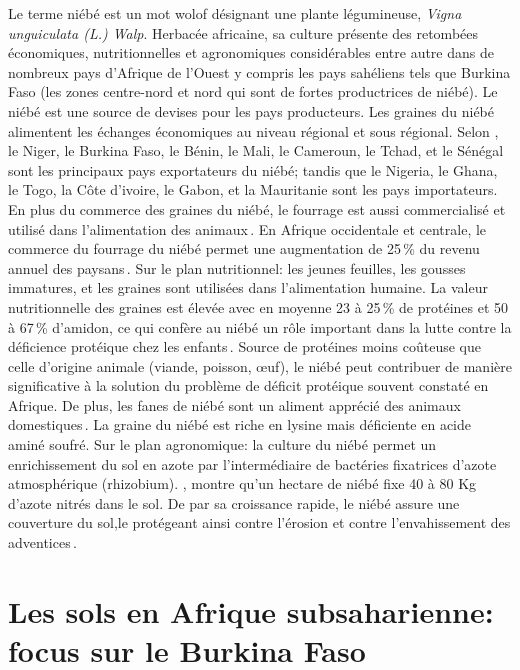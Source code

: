 \documentclass[a4paper,11pt]{article}
\begin{document}
Le terme niébé est un mot wolof désignant une plante légumineuse,
\emph{Vigna unguiculata (L.) Walp}. Herbacée africaine, sa culture
présente des retombées économiques, nutritionnelles et agronomiques
considérables entre autre dans de nombreux pays d'Afrique de l'Ouest y
compris les pays sahéliens tels que Burkina Faso (les zones
centre-nord et nord qui sont de fortes productrices de niébé).  Le
niébé est une source de devises pour les pays producteurs. Les graines
du niébé alimentent les échanges économiques au niveau régional et
sous régional. Selon \citeauthor{Langyintuo_2003},
\,\citeyear{Langyintuo_2003}\,le Niger, le Burkina Faso, le Bénin, le
Mali, le Cameroun, le Tchad, et le Sénégal sont les principaux pays
exportateurs du niébé; tandis que le Nigeria, le Ghana, le Togo, la
Côte d’ivoire, le Gabon, et la Mauritanie sont les pays
importateurs. En plus du commerce des graines du niébé, le fourrage
est aussi commercialisé et utilisé dans l’alimentation des
animaux\,\cite{Langyintuo_2003}. En Afrique occidentale et centrale,
le commerce du fourrage du niébé permet une augmentation de 25\,\% du
revenu annuel des paysans\,\cite{Quin_1997}. Sur le plan nutritionnel:
les jeunes feuilles, les gousses immatures, et les graines sont
utilisées dans l’alimentation humaine. La valeur nutritionnelle des
graines est élevée avec en moyenne 23 à 25\,\% de protéines et 50 à
67\,\% d’amidon, ce qui confère au niébé un rôle important dans la
lutte contre la déficience protéique chez les
enfants\,\cite{Quin_1997}. Source de protéines moins coûteuse que
celle d’origine animale (viande, poisson, œuf), le niébé peut
contribuer de manière significative à la solution du problème de
déficit protéique souvent constaté en Afrique. De plus, les fanes de
niébé sont un aliment apprécié des animaux
domestiques\,\cite{BAMBARA_2008}. La graine du niébé est riche en
lysine mais déficiente en acide aminé soufré. Sur le plan agronomique:
la culture du niébé permet un enrichissement du sol en azote par
l’intermédiaire de bactéries fixatrices d’azote atmosphérique
(rhizobium). \citeauthor{Quin_1997}\citeyear{Quin_1997}, montre qu’un hectare de niébé fixe 40 à 80
Kg d’azote nitrés dans le sol. De par sa croissance rapide, le niébé
assure une couverture du sol,le protégeant ainsi contre l’érosion et
contre l’envahissement des adventices\,\cite{Sawadogo_2009}.

\section{Les sols en Afrique subsaharienne: focus sur le Burkina Faso}
\end{document}
